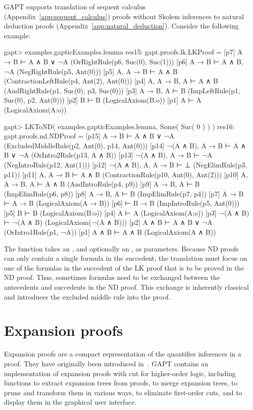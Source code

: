 \documentclass[a4paper,11pt]{book}
\newcommand{\cli}[1]{{\ttfamily {#1}}}
\begin{document}
GAPT supports translation of sequent calculus
(Appendix~\ref{app:sequent_calculus}) proofs without Skolem inferences
to natural deduction proofs (Appendix~\ref{app:natural_deduction}).
Consider the following example:
\begin{clilisting}
gapt> examples.gapticExamples.lemma
res15: gapt.proofs.lk.LKProof =
[p7] A → B ⊢ A ∧ B ∨ ¬A    (OrRightRule(p6, Suc(0), Suc(1)))
[p6] A → B ⊢ A ∧ B, ¬A    (NegRightRule(p5, Ant(0)))
[p5] A, A → B ⊢ A ∧ B    (ContractionLeftRule(p4, Ant(2), Ant(0)))
[p4] A, A → B, A ⊢ A ∧ B    (AndRightRule(p1, Suc(0), p3, Suc(0)))
[p3] A → B, A ⊢ B    (ImpLeftRule(p1, Suc(0), p2, Ant(0)))
[p2] B ⊢ B    (LogicalAxiom(B:o))
[p1] A ⊢ A    (LogicalAxiom(A:o))

gapt> LKToND( examples.gapticExamples.lemma, Some( Suc( 0 ) ) )
res16: gapt.proofs.nd.NDProof =
[p15] A → B ⊢ A ∧ B ∨ ¬A    (ExcludedMiddleRule(p2, Ant(0), p14, Ant(0)))
[p14] ¬(A ∧ B), A → B ⊢ A ∧ B ∨ ¬A    (OrIntro2Rule(p13, A ∧ B))
[p13] ¬(A ∧ B), A → B ⊢ ¬A    (NegIntroRule(p12, Ant(1)))
[p12] ¬(A ∧ B), A, A → B ⊢ ⊥    (NegElimRule(p3, p11))
[p11] A, A → B ⊢ A ∧ B    (ContractionRule(p10, Ant(0), Ant(2)))
[p10] A, A → B, A ⊢ A ∧ B    (AndIntroRule(p4, p9))
[p9] A → B, A ⊢ B    (ImpElimRule(p6, p8))
[p8] A → B, A ⊢ B    (ImpElimRule(p7, p4))
[p7] A → B ⊢ A → B    (LogicalAxiom(A → B))
[p6]  ⊢ B → B    (ImpIntroRule(p5, Ant(0)))
[p5] B ⊢ B    (LogicalAxiom(B:o))
[p4] A ⊢ A    (LogicalAxiom(A:o))
[p3] ¬(A ∧ B) ⊢ ¬(A ∧ B)    (LogicalAxiom(¬(A ∧ B)))
[p2] A ∧ B ⊢ A ∧ B ∨ ¬A    (OrIntro1Rule(p1, ¬A))
[p1] A ∧ B ⊢ A ∧ B    (LogicalAxiom(A ∧ B))

\end{clilisting}
The \cli{LKToND} function takes an \cli{LKProof}, and optionally an
\cli{Option[SequentIndex]}, as parameters.  Because ND proofs can only
contain a single formula in the succedent, the translation must focus on one
of the formulas in the succedent of the LK proof that is to be proved in the ND
proof.
Thus, sometimes formulas need to be exchanged between the antecedents and
succedents in the ND proof. This exchange is inherently classical and introduces
the excluded middle rule into the proof.

\section{Expansion proofs}

Expansion proofs are a compact representation of the quantifier inferences in a
proof.  They have originally been introduced in~\cite{Miller87Compact}.  GAPT
contains an implementation of expansion proofs with cut for higher-order logic,
including functions to extract expansion trees from proofs, to merge expansion
trees, to prune and transform them in various ways, to eliminate first-order
cuts, and to display them in the graphical user interface.
\end{document}
